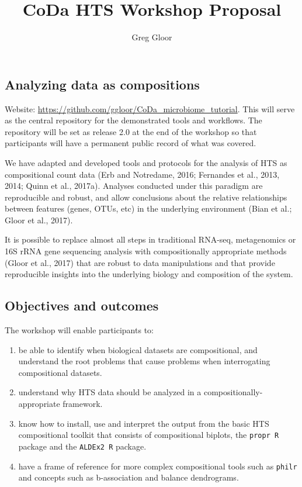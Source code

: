 \documentclass[twocolumn]{article}
\title{CoDa HTS Workshop Proposal}
\author{Greg Gloor}
\date{}
\begin{document}
\maketitle

{
\setcounter{tocdepth}{3}
\tableofcontents
}
\hypertarget{analyzing-data-as-compositions}{%
\subsection{Analyzing data as
compositions}\label{analyzing-data-as-compositions}}

Website: \url{https://github.com/ggloor/CoDa_microbiome_tutorial}. This
will serve as the central repository for the demonstrated tools and
workflows. The repository will be set as release 2.0 at the end of the
workshop so that participants will have a permanent public record of
what was covered.

We have adapted and developed tools and protocols for the analysis of
HTS as compositional count data (Erb and Notredame, 2016; Fernandes et
al., 2013, 2014; Quinn et al., 2017a). Analyses conducted under this
paradigm are reproducible and robust, and allow conclusions about the
relative relationships between features (genes, OTUs, etc) in the
underlying environment (Bian et al.; Gloor et al., 2017).

It is possible to replace almost all steps in traditional RNA-seq,
metagenomics or 16S rRNA gene sequencing analysis with compositionally
appropriate methods (Gloor et al., 2017) that are robust to data
manipulations and that provide reproducible insights into the underlying
biology and composition of the system.

\hypertarget{objectives-and-outcomes}{%
\subsection{Objectives and outcomes}\label{objectives-and-outcomes}}

The workshop will enable participants to:

\begin{enumerate}
\def\labelenumi{\arabic{enumi}.}
\item
  be able to identify when biological datasets are compositional, and
  understand the root problems that cause problems when interrogating
  compositional datasets.
\item
  understand why HTS data should be analyzed in a
  compositionally-appropriate framework.
\item
  know how to install, use and interpret the output from the basic HTS
  compositional toolkit that consists of compositional biplots, the
  \texttt{propr\ R} package and the \texttt{ALDEx2\ R} package.
\item
  have a frame of reference for more complex compositional tools such as
  \texttt{philr} and concepts such as b-association and balance
  dendrograms.
\end{enumerate}
\end{document}
